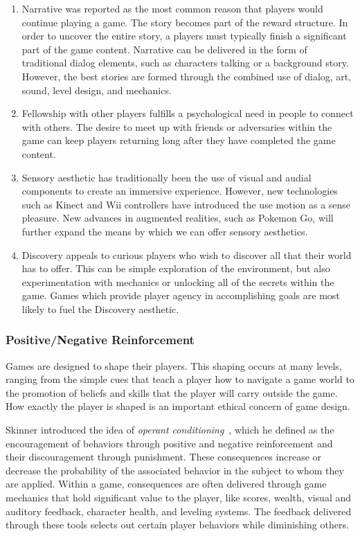 \documentclass{sig-alternate-05-2015}
\begin{document}
\begin{enumerate}
\setcounter{enumi}{0}
\item Narrative was reported as the most common reason that players would continue playing a game. The story becomes part of the reward structure. In order to uncover the entire story, a players must typically finish a significant part of the game content. Narrative can be delivered in the form of traditional dialog elements, such as characters talking or a background story. However, the best stories are formed through the combined use of dialog, art, sound, level design, and mechanics.
\item Fellowship with other players fulfills a psychological need in people to connect with others. The desire to meet up with friends or adversaries within the game can keep players returning long after they have completed the game content.
\item Sensory aesthetic has traditionally been the use of visual and audial components to create an immersive experience. However, new technologies such as Kinect and Wii controllers have introduced the use motion as a sense pleasure. New advances in augmented realities, such as Pokemon Go, will further expand the means by which we can offer sensory aesthetics.
\item Discovery appeals to curious players who wish to discover all that their world has to offer. This can be simple exploration of the environment, but also experimentation with mechanics or unlocking all of the secrets within the game. Games which provide player agency in accomplishing goals are most likely to fuel the Discovery aesthetic. 
\end{enumerate}


\subsubsection{Positive/Negative Reinforcement}


Games are designed to shape their players. This shaping occurs at many levels, ranging from the simple cues that teach a player how to navigate a game world to the promotion of beliefs and skills that the player will carry outside the game. How exactly the player is shaped is an important ethical concern of game design.



Skinner introduced the idea of {\em operant conditioning}~\cite{skinner1963operant}, which he defined as the encouragement of behaviors through positive and negative reinforcement and their discouragement through punishment. These consequences increase or decrease the probability of the associated behavior in the subject to whom they are applied. Within a game, consequences are often delivered through game mechanics that hold significant value to the player, like scores, wealth, visual and auditory feedback, character health, and leveling systems. The feedback delivered through these tools selects out certain player behaviors while diminishing others. 
\end{document}

